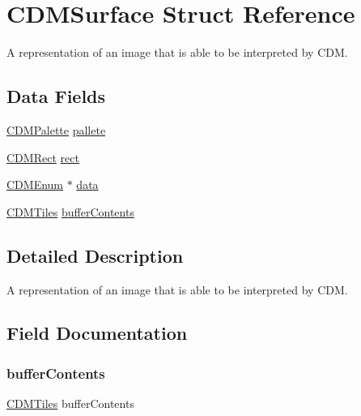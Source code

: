 \hypertarget{struct_c_d_m_surface}{}\section{C\+D\+M\+Surface Struct Reference}
\label{struct_c_d_m_surface}


A representation of an image that is able to be interpreted by C\+DM.  


\subsection*{Data Fields}
\begin{DoxyCompactItemize}
\item 
\mbox{\hyperlink{struct_c_d_m_palette}{C\+D\+M\+Palette}} \mbox{\hyperlink{struct_c_d_m_surface_a22f86f11ee9943243675467949ec8505}{pallete}}
\item 
\mbox{\hyperlink{_c_d_m_8h_a23402dc2128c3c7f1e88e505a5631b9c}{C\+D\+M\+Rect}} \mbox{\hyperlink{struct_c_d_m_surface_aa61e26c3b59930152cdaa0ce2dac8b14}{rect}}
\item 
\mbox{\hyperlink{_c_d_m_8h_a3b61dfc1ca706f8e42c76483dc93576f}{C\+D\+M\+Enum}} $\ast$ \mbox{\hyperlink{struct_c_d_m_surface_adce19b3211f4678a93f6924f7888c7e9}{data}}
\item 
\mbox{\hyperlink{struct_c_d_m_tiles}{C\+D\+M\+Tiles}} \mbox{\hyperlink{struct_c_d_m_surface_a095e3adb5378aedc48f9a15d9f2e84b9}{buffer\+Contents}}
\end{DoxyCompactItemize}


\subsection{Detailed Description}
A representation of an image that is able to be interpreted by C\+DM. 

\subsection{Field Documentation}
\mbox{\label{struct_c_d_m_surface_a095e3adb5378aedc48f9a15d9f2e84b9}} 
\subsubsection{\texorpdfstring{buffer\+Contents}{bufferContents}}
{\footnotesize\ttfamily \mbox{\hyperlink{struct_c_d_m_tiles}{C\+D\+M\+Tiles}} buffer\+Contents}

